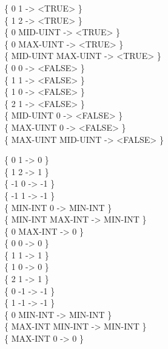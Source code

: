 \begin{tt}
\{        0        1  -> <TRUE>  \} \\
\{        1        2  -> <TRUE>  \} \\
\{        0 MID-UINT  -> <TRUE>  \} \\
\{        0 MAX-UINT  -> <TRUE>  \} \\
\{ MID-UINT MAX-UINT  -> <TRUE>  \} \\
\{        0        0  -> <FALSE> \} \\
\{        1        1  -> <FALSE> \} \\
\{        1        0  -> <FALSE> \} \\
\{        2        1  -> <FALSE> \} \\
\{ MID-UINT        0  -> <FALSE> \} \\
\{ MAX-UINT        0  -> <FALSE> \} \\
\{ MAX-UINT MID-UINT  -> <FALSE> \}

\{       0       1  ->       0 \} \\
\{       1       2  ->       1 \} \\
\{      -1       0  ->      -1 \} \\
\{      -1       1  ->      -1 \} \\
\{ MIN-INT       0  -> MIN-INT \} \\
\{ MIN-INT MAX-INT  -> MIN-INT \} \\
\{       0 MAX-INT  ->       0 \} \\
\{       0       0  ->       0 \} \\
\{       1       1  ->       1 \} \\
\{       1       0  ->       0 \} \\
\{       2       1  ->       1 \} \\
\{       0      -1  ->      -1 \} \\
\{       1      -1  ->      -1 \} \\
\{       0 MIN-INT  -> MIN-INT \} \\
\{ MAX-INT MIN-INT  -> MIN-INT \} \\
\{ MAX-INT       0  ->       0 \} \\


\end{tt}
